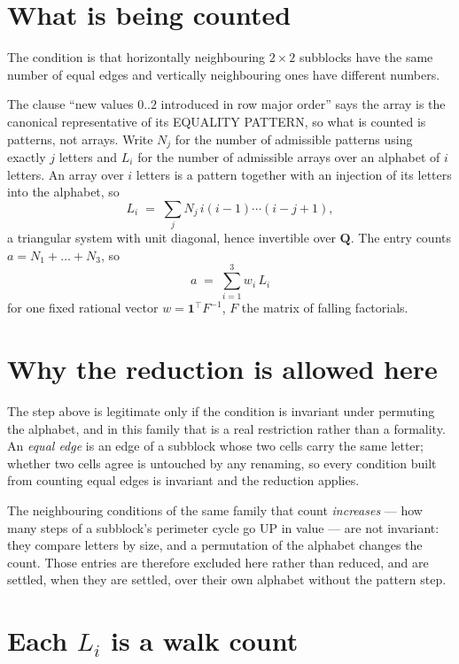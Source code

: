 \documentclass[11pt,a4paper]{article}
\theoremstyle{plain}
\theoremstyle{definition}
\begin{document}
\section{What is being counted}

The condition is that horizontally neighbouring $2\times2$ subblocks have the same number of equal edges and vertically neighbouring ones have different numbers.

The clause ``new values $0..2$ introduced in row major order'' says the array is the
canonical representative of its EQUALITY PATTERN, so what is counted is patterns, not arrays.
Write $N_j$ for the number of admissible patterns using exactly $j$ letters and $L_i$ for the
number of admissible arrays over an alphabet of $i$ letters. An array over $i$ letters is a
pattern together with an injection of its letters into the alphabet, so
\[
L_i\;=\;\sum_j N_j\,i(i-1)\cdots(i-j+1),
\]
a triangular system with unit diagonal, hence invertible over $\mathbf{Q}$. The entry counts
$a=N_1+\dots+N_{3}$, so
\[
a\;=\;\sum_{i=1}^{3}w_i\,L_i
\]
for one fixed rational vector $w=\mathbf{1}^{\!\top}F^{-1}$, $F$ the matrix of falling
factorials.

\section{Why the reduction is allowed here}

The step above is legitimate only if the condition is invariant under permuting the alphabet,
and in this family that is a real restriction rather than a formality. An \emph{equal edge}
is an edge of a subblock whose two cells carry the same letter; whether two cells agree is
untouched by any renaming, so every condition built from counting equal edges is invariant and
the reduction applies.

The neighbouring conditions of the same family that count \emph{increases} --- how many steps
of a subblock's perimeter cycle go UP in value --- are not invariant: they compare letters by
size, and a permutation of the alphabet changes the count. Those entries are therefore excluded
here rather than reduced, and are settled, when they are settled, over their own alphabet
without the pattern step.

\section{Each $L_i$ is a walk count}
\end{document}
